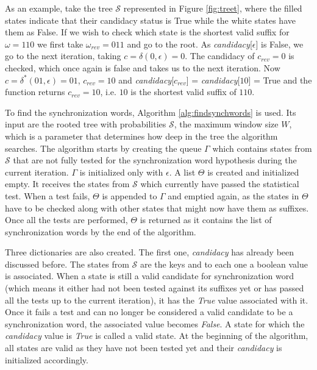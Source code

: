 { As an example, take the tree $\mathcal{S}$ represented in Figure \ref{fig:treet}, where the filled states indicate that their candidacy status is True while the white states have them as False. If we wish to check which state is the shortest valid suffix for $\omega = 110$ we first take $\omega_{rev} = 011$ and go to the root. As \textit{candidacy}[$\epsilon$] is False, we go to the next iteration, taking $c = \delta(0, \epsilon) = 0$. The candidacy of $c_{rev} = 0$ is checked, which once again is false and takes us to the next iteration. Now $c = \delta^*(01, \epsilon) = 01$, $c_{rev} = 10$ and \textit{candidacy}[$c_{rev}$] = \textit{candidacy}[$10$] = True and the function returns $c_{rev} = 10$, i.e. $10$ is the shortest valid suffix of $110$.

To find the synchronization words, Algorithm \ref{alg:findsynchwords} is used. Its input are the rooted tree with probabilities $\mathcal{S}$, the maximum window size $W$, which is a parameter that determines how deep in the tree the algorithm searches. The algorithm starts by creating the queue $\Gamma$ which contains states from $\mathcal{S}$ that are not fully tested for the synchronization word hypothesis during the current iteration. $\Gamma$ is initialized only with $\epsilon$. A list $\Theta$ is created and initialized empty. It receives the states from $\mathcal{S}$ which currently have passed the statistical test. When a test fails, $\Theta$ is appended to $\Gamma$ and emptied again, as the states in $\Theta$ have to be checked along with other states that might now have them as suffixes. Once all the tests are performed, $\Theta$ is returned as it contains the list of synchronization words by the end of the algorithm.
 
 Three dictionaries are also created. The first one, \textit{candidacy} has already been discussed before. The states from $\mathcal{S}$ are the keys and to each one a boolean value is associated. When a state is still a valid candidate for synchronization word (which means it either had not been tested against its suffixes yet or has passed all the tests up to the current iteration), it has the \textit{True} value associated with it. Once it fails a test and can no longer be considered a valid candidate to be a synchronization word, the associated value becomes \textit{False}. A state for which the \textit{candidacy} value is \textit{True} is called a valid state. At the beginning of the algorithm, all states are valid as they have not been tested yet and their \textit{candidacy} is initialized accordingly.
 
}
